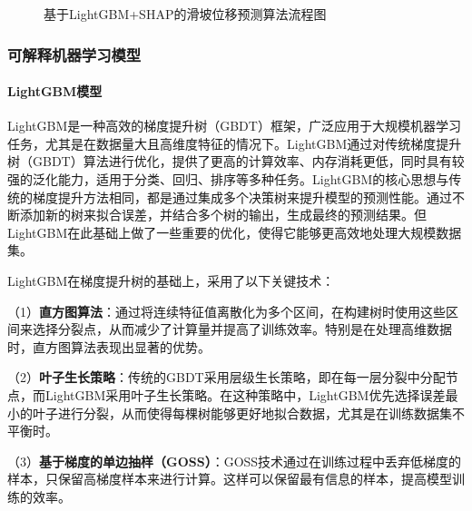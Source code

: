 \documentclass[12pt,a4paper]{article}
\newcommand{\figcaption}[2]{%
  \caption[#1]{{\CJKfamily{songbold}#1}}}
\begin{document}
\begin{figure}[htbp]
\figcaption{基于LightGBM+SHAP的滑坡位移预测算法流程图}{Algorithm Flowchart of Landslide Displacement Feature Analysis Based on LightGBM+SHAP}
\label{fig:algorithm_flowchart}
\end{figure}

\subsubsection{可解释机器学习模型}

\paragraph{\textbf{LightGBM模型}}

LightGBM是一种高效的梯度提升树（GBDT）框架，广泛应用于大规模机器学习任务，尤其是在数据量大且高维度特征的情况下。LightGBM通过对传统梯度提升树（GBDT）算法进行优化，提供了更高的计算效率、内存消耗更低，同时具有较强的泛化能力，适用于分类、回归、排序等多种任务。LightGBM的核心思想与传统的梯度提升方法相同，都是通过集成多个决策树来提升模型的预测性能。通过不断添加新的树来拟合误差，并结合多个树的输出，生成最终的预测结果。但LightGBM在此基础上做了一些重要的优化，使得它能够更高效地处理大规模数据集。

LightGBM在梯度提升树的基础上，采用了以下关键技术：

    （1）\textbf{直方图算法}：通过将连续特征值离散化为多个区间，在构建树时使用这些区间来选择分裂点，从而减少了计算量并提高了训练效率。特别是在处理高维数据时，直方图算法表现出显著的优势。

    （2）\textbf{叶子生长策略}：传统的GBDT采用层级生长策略，即在每一层分裂中分配节点，而LightGBM采用叶子生长策略。在这种策略中，LightGBM优先选择误差最小的叶子进行分裂，从而使得每棵树能够更好地拟合数据，尤其是在训练数据集不平衡时。

    （3）\textbf{基于梯度的单边抽样（GOSS）}：GOSS技术通过在训练过程中丢弃低梯度的样本，只保留高梯度样本来进行计算。这样可以保留最有信息的样本，提高模型训练的效率。
\end{document}

